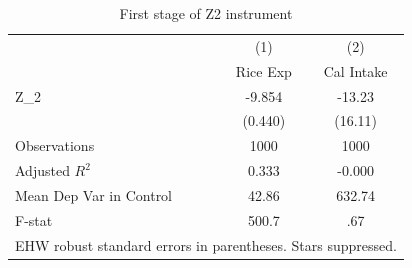 \begin{table}[htbp]\centering
\caption{First stage of Z2 instrument}
\begin{tabular}{l*{2}{c}}
\hline\hline
                    &\multicolumn{1}{c}{(1)}&\multicolumn{1}{c}{(2)}\\
                    &\multicolumn{1}{c}{Rice Exp}&\multicolumn{1}{c}{Cal Intake}\\
\hline
Z\_2                 &      -9.854&      -13.23\\
                    &     (0.440)&     (16.11)\\
\hline
Observations        &        1000&        1000\\
Adjusted \(R^{2}\)  &       0.333&      -0.000\\
Mean Dep Var in Control&       42.86&      632.74\\
F-stat              &       500.7&         .67\\
\hline\hline
\multicolumn{3}{l}{\footnotesize EHW robust standard errors in parentheses. Stars suppressed.}\\
\end{tabular}
\end{table}
